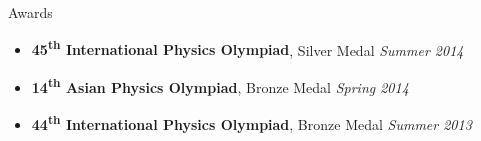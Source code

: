 \documentclass[10pt]{article}
\begin{document}
\begin{area}{Awards}
\begin{itemize}
    \item \textbf{45\textsuperscript{th} International Physics Olympiad}, Silver Medal \hfill \emph{Summer 2014}
    \item \textbf{14\textsuperscript{th} Asian Physics Olympiad}, Bronze Medal \hfill \emph{Spring 2014}
    \item \textbf{44\textsuperscript{th} International Physics Olympiad}, Bronze Medal \hfill \emph{Summer 2013}
\end{itemize}
\end{area}
\end{document}
